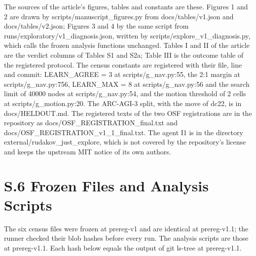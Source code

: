 \documentclass[journal,onecolumn]{IEEEtran}
\begin{document}
The sources of the article's figures, tables and constants are these.
Figures 1 and 2 are drawn by scripts/manuscript\_figures.py from
docs/tables/v1.json and docs/tables/v2.json; Figures 3 and 4 by the same
script from runs/exploratory/v1\_diagnosis.json, written by
scripts/explore\_v1\_diagnosis.py, which calls the frozen analysis
functions unchanged. Tables I and II of the article are the verdict
columns of Tables S1 and S2a; Table III is the outcome table of the
registered protocol. The census constants are registered with their
file, line and commit: LEARN\_AGREE = 3 at scripts/g\_nav.py:55, the 2:1
margin at scripts/g\_nav.py:756, LEARN\_MAX = 8 at scripts/g\_nav.py:56
and the search limit of 40000 nodes at scripts/g\_nav.py:54, and the
motion threshold of 2 cells at scripts/g\_motion.py:20. The ARC-AGI-3
split, with the move of dc22, is in docs/HELDOUT.md. The registered
texts of the two OSF registrations are in the repository as
docs/OSF\_REGISTRATION\_final.txt and
docs/OSF\_REGISTRATION\_v1\_1\_final.txt. The agent I1 is in the
directory external/rudakov\_just\_explore, which is not covered by the
repository's license and keeps the upstream MIT notice of its own
authors.

\section*{S.6 Frozen Files and Analysis
Scripts}\label{s.6-frozen-files-and-analysis-scripts}

The six census files were frozen at prereg-v1 and are identical at
prereg-v1.1; the runner checked their blob hashes before every run. The
analysis scripts are those at prereg-v1.1. Each hash below equals the
output of git ls-tree at prereg-v1.1.
\end{document}
